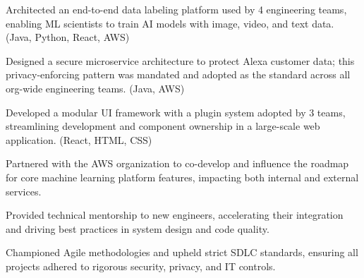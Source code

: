 \documentclass[]{main}
\begin{document}
\begin{minipage}[t]{0.73\textwidth}
\begin{tightemize}
\item Architected an end-to-end data labeling platform used by 4 engineering teams, enabling ML scientists to train AI models with image, video, and text data. (Java, Python, React, AWS)
\item Designed a secure microservice architecture to protect Alexa customer data; this privacy-enforcing pattern was mandated and adopted as the standard across all org-wide engineering teams. (Java, AWS)
\item Developed a modular UI framework with a plugin system adopted by 3 teams, streamlining development and component ownership in a large-scale web application. (React, HTML, CSS)
\item Partnered with the AWS organization to co-develop and influence the roadmap for core machine learning platform features, impacting both internal and external services.
\item Provided technical mentorship to new engineers, accelerating their integration and driving best practices in system design and code quality.
\item Championed Agile methodologies and upheld strict SDLC standards, ensuring all projects adhered to rigorous security, privacy, and IT controls.

\end{tightemize}
\end{minipage}
\end{document}
